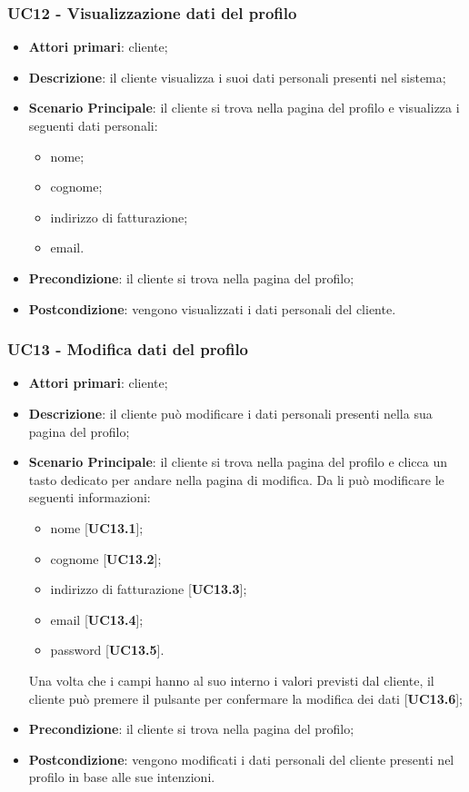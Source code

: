\subsubsection{UC12 - Visualizzazione dati del profilo}
\begin{itemize}
\item \textbf{Attori primari}: cliente;
\item \textbf{Descrizione}: il cliente visualizza i suoi dati personali presenti nel sistema;
\item \textbf{Scenario Principale}: il cliente si trova nella pagina del profilo e visualizza i seguenti dati personali:
\begin{itemize}
\item nome;
\item cognome;
\item indirizzo di fatturazione;
\item email.
\end{itemize}
\item \textbf{Precondizione}: il cliente si trova nella pagina del profilo;
\item \textbf{Postcondizione}: vengono visualizzati i dati personali del cliente.
\end{itemize}

\subsubsection{UC13 - Modifica dati del profilo}
\begin{itemize}
\item \textbf{Attori primari}: cliente;
\item \textbf{Descrizione}: il cliente può modificare i dati personali presenti nella sua pagina del profilo;
\item \textbf{Scenario Principale}: il cliente si trova nella pagina del profilo e clicca un tasto dedicato per andare nella pagina di modifica. Da li può modificare le seguenti informazioni:
\begin{itemize}
\item nome [\textbf{UC13.1}];
\item cognome [\textbf{UC13.2}];
\item indirizzo di fatturazione [\textbf{UC13.3}];
\item email [\textbf{UC13.4}];
\item password [\textbf{UC13.5}].
\end{itemize}
Una volta che i campi hanno al suo interno i valori previsti dal cliente, il cliente può premere il pulsante per confermare la modifica dei dati [\textbf{UC13.6}];
\item \textbf{Precondizione}: il cliente si trova nella pagina del profilo;
\item \textbf{Postcondizione}: vengono modificati i dati personali del cliente presenti nel profilo in base alle sue intenzioni.
\end{itemize}

